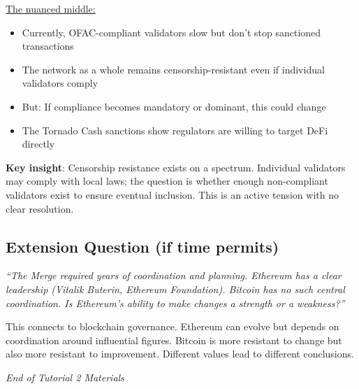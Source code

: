 \documentclass[11pt]{article}
\begin{document}
\medskip
\noindent\underline{The nuanced middle:}
\begin{itemize}[leftmargin=*]
\item Currently, OFAC-compliant validators slow but don't stop sanctioned transactions
\item The network as a whole remains censorship-resistant even if individual validators comply
\item But: If compliance becomes mandatory or dominant, this could change
\item The Tornado Cash sanctions show regulators are willing to target DeFi directly
\end{itemize}

\medskip
\noindent\textbf{Key insight}: Censorship resistance exists on a spectrum. Individual validators may comply with local laws; the question is whether enough non-compliant validators exist to ensure eventual inclusion. This is an active tension with no clear resolution.

\subsection*{Extension Question (if time permits)}

\textit{``The Merge required years of coordination and planning. Ethereum has a clear leadership (Vitalik Buterin, Ethereum Foundation). Bitcoin has no such central coordination. Is Ethereum's ability to make changes a strength or a weakness?''}

\medskip
This connects to blockchain governance. Ethereum can evolve but depends on coordination around influential figures. Bitcoin is more resistant to change but also more resistant to improvement. Different values lead to different conclusions.

\vfill
\begin{flushright}
\textit{End of Tutorial 2 Materials}
\end{flushright}
\end{document}
